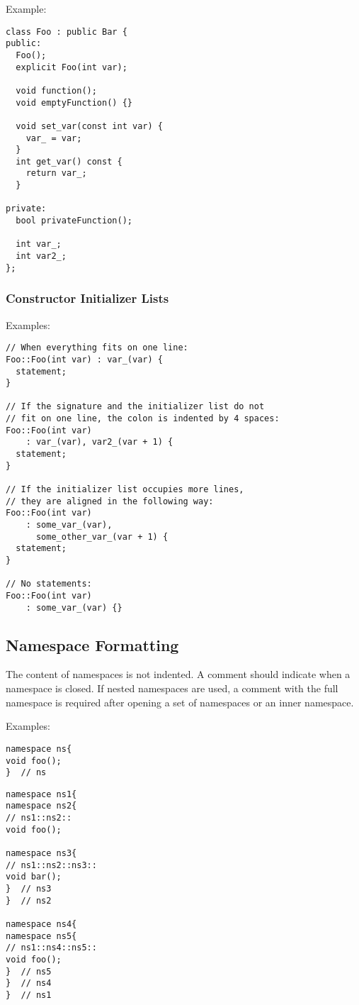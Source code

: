 Example:
\begin{lstlisting}
class Foo : public Bar {
public:
  Foo();
  explicit Foo(int var);

  void function();
  void emptyFunction() {}

  void set_var(const int var) {
    var_ = var;
  }
  int get_var() const {
    return var_;
  }

private:
  bool privateFunction();

  int var_;
  int var2_;
};
\end{lstlisting}

\subsubsection{Constructor Initializer Lists}

Examples:
\begin{lstlisting}
// When everything fits on one line:
Foo::Foo(int var) : var_(var) {
  statement;
}

// If the signature and the initializer list do not
// fit on one line, the colon is indented by 4 spaces:
Foo::Foo(int var)
    : var_(var), var2_(var + 1) {
  statement;
}

// If the initializer list occupies more lines,
// they are aligned in the following way:
Foo::Foo(int var)
    : some_var_(var),
      some_other_var_(var + 1) {
  statement;
}

// No statements:
Foo::Foo(int var)
    : some_var_(var) {}
\end{lstlisting}

\subsection{Namespace Formatting}

The content of namespaces is not indented.
A comment should indicate when a namespace is closed.
If nested namespaces are used, a comment with the full namespace is required after opening a set of namespaces or an inner namespace.

Examples:
\begin{lstlisting}
namespace ns{
void foo();
}  // ns
\end{lstlisting}

\begin{lstlisting}
namespace ns1{
namespace ns2{
// ns1::ns2::
void foo();

namespace ns3{
// ns1::ns2::ns3::
void bar();
}  // ns3
}  // ns2

namespace ns4{
namespace ns5{
// ns1::ns4::ns5::
void foo();
}  // ns5
}  // ns4
}  // ns1
\end{lstlisting}


